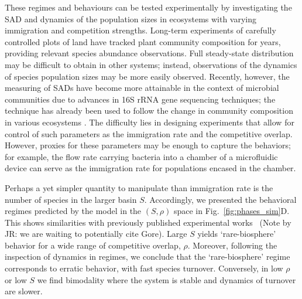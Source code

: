 \documentclass[9pt,twocolumn,twoside,lineno]{pnas-new}
\begin{document}
These regimes and behaviours can be tested experimentally by investigating the SAD and dynamics of the population sizes in ecosystems with varying immigration and competition strengths.
Long-term experiments of carefully controlled plots of land have tracked plant community composition for years, providing relevant species abundance observations.
Full steady-state distribution may be difficult to obtain in other systems; instead, observations of the dynamics of species population sizes may be more easily observed.
Recently, however, the measuring of SADs have become more attainable in the context of microbial communities due to advances in 16S rRNA gene sequencing techniques; the technique has already been used to follow the change in community composition in various ecosystems \cite{ratzke2020strength}.
The difficulty lies in designing experiments that allow for control of such parameters as the immigration rate and the competitive overlap.
However, proxies for these parameters may be enough to capture the behaviors; for example, the flow rate carrying bacteria into a chamber of a microfluidic device can serve as the immigration rate for populations encased in the chamber.

Perhaps a yet simpler quantity to manipulate than immigration rate is the number of species in the larger basin $S$.
Accordingly, we presented the behavioral regimes predicted by the model in the $(S,\rho)$ space in Fig.~\ref{fig:phases_sim}D.
This shows similarities with previously published experimental works~\cite{} (Note by JR: we are waiting to potentially cite Gore). %
Large $S$ yields `rare-biosphere' behavior for a wide range of competitive overlap, $\rho$.
Moreover, following the inspection of dynamics in regimes, we conclude that the `rare-biosphere' regime corresponds to erratic behavior, with fast species turnover.
Conversely, in low $\rho$ or low $S$ we find bimodality where the system is stable and dynamics of turnover are slower.
\end{document}
